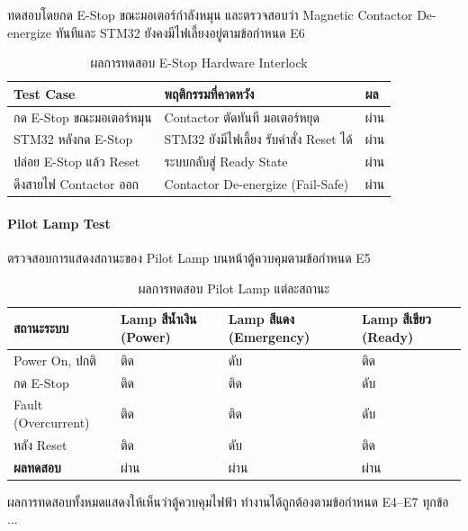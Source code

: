 ทดสอบโดยกด E-Stop ขณะมอเตอร์กำลังหมุน
และตรวจสอบว่า Magnetic Contactor De-energize
ทันทีและ STM32 ยังคงมีไฟเลี้ยงอยู่ตามข้อกำหนด E6

\begin{table}[H]
  \centering
  \caption{ผลการทดสอบ E-Stop Hardware Interlock}
  \label{tab:estop_test}
  \begin{tabular}{lll}
    \toprule
    Test Case & พฤติกรรมที่คาดหวัง & ผล \\
    \midrule
    กด E-Stop ขณะมอเตอร์หมุน
      & Contactor ตัดทันที มอเตอร์หยุด
      & ผ่าน \\
    STM32 หลังกด E-Stop
      & STM32 ยังมีไฟเลี้ยง รับคำสั่ง Reset ได้
      & ผ่าน \\
    ปล่อย E-Stop แล้ว Reset
      & ระบบกลับสู่ Ready State
      & ผ่าน \\
    ดึงสายไฟ Contactor ออก
      & Contactor De-energize (Fail-Safe)
      & ผ่าน \\
    \bottomrule
  \end{tabular}
\end{table}

\paragraph{Pilot Lamp Test}

ตรวจสอบการแสดงสถานะของ Pilot Lamp
บนหน้าตู้ควบคุมตามข้อกำหนด E5

\begin{table}[H]
  \centering
  \caption{ผลการทดสอบ Pilot Lamp แต่ละสถานะ}
  \label{tab:lamp_test}
  \begin{tabular}{llll}
    \toprule
    สถานะระบบ & Lamp สีน้ำเงิน (Power) & Lamp สีแดง (Emergency) & Lamp สีเขียว (Ready) \\
    \midrule
    Power On, ปกติ    & ติด & ดับ & ติด \\
    กด E-Stop         & ติด & ติด & ดับ \\
    Fault (Overcurrent) & ติด & ติด & ดับ \\
    หลัง Reset        & ติด & ดับ & ติด \\
    \midrule
    \textbf{ผลทดสอบ}  & ผ่าน & ผ่าน & ผ่าน \\
    \bottomrule
  \end{tabular}
\end{table}

ผลการทดสอบทั้งหมดแสดงให้เห็นว่าตู้ควบคุมไฟฟ้า
ทำงานได้ถูกต้องตามข้อกำหนด E4--E7 ทุกข้อ
...

\begin{table}[H]
  \centering
  \caption{ผล Unit Test Joystick แต่ละโหมด}
  \label{tab:joystick_unit_test}
\end{table}

